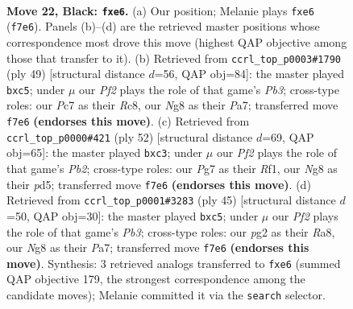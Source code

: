 \documentclass[11pt]{article}
\begin{document}
\clearpage

\begin{figure}[p]\centering
\begin{subfigure}{0.46\textwidth}\centering
\resizebox{\linewidth}{!}{%
\newchessgame
\chessboard[
  setfen={1k4nr/p1p1qppp/1p2B3/2p5/8/2P2P2/1P1Q2PP/2K1R3 b - - 0 22},
  showmover=false,
  pgfstyle=straightmove, color=movearrow, markmove={f7-e6}
]}
\caption{}
\end{subfigure}\hfill
\begin{subfigure}{0.46\textwidth}\centering
\resizebox{\linewidth}{!}{%
\newchessgame
\chessboard[
  setfen={2r3k1/p1q2pp1/1p6/2BRp2p/2Q1P3/P1P2P2/4K1PP/8 b - - 0 25},
  showmover=false,
  pgfstyle=straightmove, color=movearrow, markmove={b6-c5}
]}
\caption{}
\end{subfigure}
\\[4pt]
\begin{subfigure}{0.46\textwidth}\centering
\resizebox{\linewidth}{!}{%
\newchessgame
\chessboard[
  setfen={2r3k1/pp4p1/2q4p/3p4/8/PQb4P/1P3PP1/5RK1 w - - 0 27},
  showmover=false,
  pgfstyle=straightmove, color=movearrow, markmove={b2-c3}
]}
\caption{}
\end{subfigure}\hfill
\begin{subfigure}{0.46\textwidth}\centering
\resizebox{\linewidth}{!}{%
\newchessgame
\chessboard[
  setfen={r5k1/pq3pp1/1p2p2p/2B5/2P5/6P1/PPQ2P1P/3R2K1 b - - 0 23},
  showmover=false,
  pgfstyle=straightmove, color=movearrow, markmove={b6-c5}
]}
\caption{}
\end{subfigure}
\caption{\textbf{Move 22, Black: \texttt{fxe6}.} (a) Our position; Melanie plays \texttt{fxe6} (\texttt{f7e6}). Panels (b)--(d) are the retrieved master positions whose correspondence most drove this move (highest QAP objective among those that transfer to it). (b) Retrieved from \texttt{ccrl\_top\_p0003\#1790} (ply 49) [structural distance $d$=56, QAP obj=84]: the master played \texttt{bxc5}; under $\mu$ our \emph{Pf2} plays the role of that game's \emph{Pb3}; cross-type roles: our \emph{P}c7 as their \emph{R}c8, our \emph{N}g8 as their \emph{P}a7; transferred move \texttt{f7e6} \textbf{(endorses this move)}. (c) Retrieved from \texttt{ccrl\_top\_p0000\#421} (ply 52) [structural distance $d$=69, QAP obj=65]: the master played \texttt{bxc3}; under $\mu$ our \emph{Pf2} plays the role of that game's \emph{Pb2}; cross-type roles: our \emph{P}g7 as their \emph{R}f1, our \emph{N}g8 as their \emph{p}d5; transferred move \texttt{f7e6} \textbf{(endorses this move)}. (d) Retrieved from \texttt{ccrl\_top\_p0001\#3283} (ply 45) [structural distance $d$=50, QAP obj=30]: the master played \texttt{bxc5}; under $\mu$ our \emph{Pf2} plays the role of that game's \emph{Pb3}; cross-type roles: our \emph{p}g2 as their \emph{R}a8, our \emph{N}g8 as their \emph{P}a7; transferred move \texttt{f7e6} \textbf{(endorses this move)}. Synthesis: 3 retrieved analogs transferred to \texttt{fxe6} (summed QAP objective 179, the strongest correspondence among the candidate moves); Melanie committed it via the \texttt{search} selector.}
\label{fig:thought-m43}
\end{figure}
\end{document}
